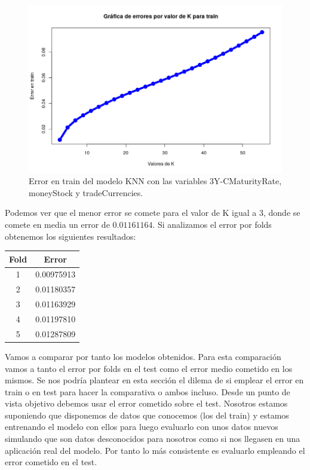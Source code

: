 \documentclass[12pt,a4paper]{article}
\begin{document}
\begin{figure}[H]
	\centering 
	\includegraphics[scale=0.6]{./Imagenes/Regresion/knn6.png}
	\caption{Error en train del modelo KNN con las variables 3Y-CMaturityRate, moneyStock y tradeCurrencies.}
\end{figure}

Podemos ver que el menor error se comete para el valor de K igual a $3$, donde se comete en media un error de $0.01161164$. Si analizamos el error por folds obtenemos los siguientes resultados:

\begin{table}[H]
	\centering
	\begin{tabular}{|c|c|}
		\hline
		\textbf{Fold} & \textbf{Error} \\ \hline
		1              & 0.00975913     \\ \hline
		2              & 0.01180357     \\ \hline
		3              & 0.01163929     \\ \hline
		4              & 0.01197810     \\ \hline
		5              & 0.01287809     \\ \hline
	\end{tabular}
\end{table}

Vamos a comparar por tanto los modelos obtenidos. Para esta comparación vamos a tanto el error por folds en el test como el error medio cometido en los mismos. Se nos podría plantear en esta sección el dilema de si emplear el error en train o en test para hacer la comparativa o ambos incluso. Desde un punto de vista objetivo debemos usar el error cometido sobre el test. Nosotros estamos suponiendo que disponemos de datos que conocemos (los del train) y estamos entrenando el modelo con ellos para luego evaluarlo con unos datos nuevos simulando que son datos desconocidos para nosotros como si nos llegasen en una aplicación real del modelo. Por tanto lo más consistente es evaluarlo empleando el error cometido en el test.
\end{document}
